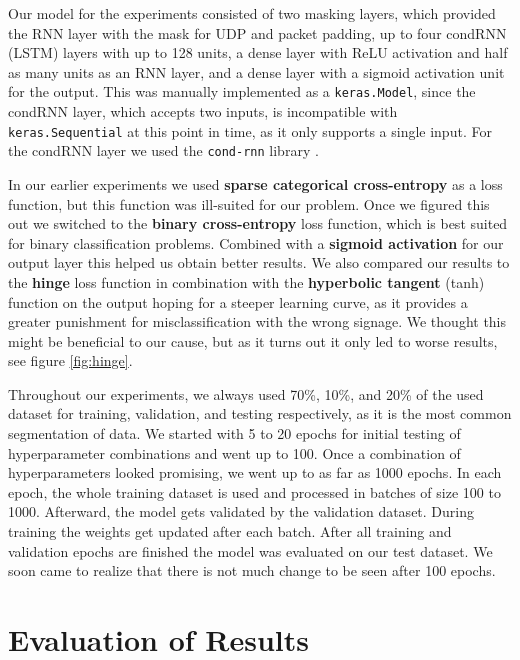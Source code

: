 \documentclass[
	ngerman,
	ruledheaders=section,%
	class=report,%
	thesis={type=bachelor},%
	accentcolor=9c,%
	custommargins=true,%
	marginpar=false,%
	parskip=half-,%
	fontsize=11pt,%
]{tudapub}
\let\code\texttt
\begin{document}
Our model for the experiments consisted of two masking layers, which provided the RNN layer with the mask for UDP and packet padding,
up to four condRNN (LSTM) layers with up to 128 units,
a dense layer with ReLU activation and half as many units as an RNN layer,
and a dense layer with a sigmoid activation unit for the output.
This was manually implemented as a \code{keras.Model}, since the condRNN layer, which accepts two inputs, is incompatible with \code{keras.Sequential} at this point in time, as it only supports a single input.
For the condRNN layer we used the \code{cond-rnn} library \cite{remyPhilipperemyCondRnn2020}.

In our earlier experiments we used \textbf{sparse categorical cross-entropy} as a loss function, but this function was ill-suited for our problem.
Once we figured this out we switched to the \textbf{binary cross-entropy} loss function, which is best suited for binary classification problems.
Combined with a \textbf{sigmoid activation} for our output layer this helped us obtain better results.
We also compared our results to the \textbf{hinge} loss function in combination with the \textbf{hyperbolic tangent} (tanh) function on the output hoping for a steeper learning curve, as it provides a greater punishment for misclassification with the wrong signage.
We thought this might be beneficial to our cause, but as it turns out it only led to worse results, see figure \ref{fig:hinge}.

Throughout our experiments, we always used 70\%, 10\%, and 20\% of the used dataset for training, validation, and testing respectively, as it is the most common segmentation of data.
We started with 5 to 20 epochs for initial testing of hyperparameter combinations and went up to 100.
Once a combination of hyperparameters looked promising, we went up to as far as 1000 epochs.
In each epoch, the whole training dataset is used and processed in batches of size 100 to 1000.
Afterward, the model gets validated by the validation dataset.
During training the weights get updated after each batch. %
After all training and validation epochs are finished the model was evaluated on our test dataset.
We soon came to realize that there is not much change to be seen after 100 epochs.

\section{Evaluation of Results}
\label{sec:exEval}
\end{document}

